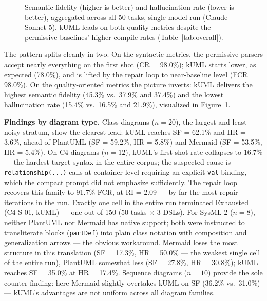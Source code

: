 \documentclass[acmsmall,nonacm]{acmart}
\begin{document}
\begin{figure}[h]
\centering
{}
\caption{Semantic fidelity (higher is better) and hallucination rate (lower is better), aggregated across all 50 tasks, single-model run (Claude Sonnet 5). kUML leads on both quality metrics despite the permissive baselines' higher compile rates (Table~\ref{tab:overall}).}
\label{fig:sf-hr-bars}
\end{figure}

The pattern splits cleanly in two. On the syntactic metrics, the permissive parsers accept nearly everything on the first shot (CR = 98.0\%); kUML starts lower, as expected (78.0\%), and is lifted by the repair loop to near-baseline level (FCR = 98.0\%). On the quality-oriented metrics the picture inverts: kUML delivers the highest semantic fidelity (45.3\% vs.\ 37.9\% and 37.4\%) and the lowest hallucination rate (15.4\% vs.\ 16.5\% and 21.9\%), visualized in Figure~\ref{fig:sf-hr-bars}.

\textbf{Findings by diagram type.} Class diagrams ($n = 20$), the largest and least noisy stratum, show the clearest lead: kUML reaches SF = 62.1\% and HR = 3.6\%, ahead of PlantUML (SF = 59.2\%, HR = 5.8\%) and Mermaid (SF = 53.5\%, HR = 5.4\%). On C4 diagrams ($n = 12$), kUML's first-shot rate collapses to 16.7\% --- the hardest target syntax in the entire corpus; the suspected cause is \texttt{relationship(...)} calls at container level requiring an explicit \texttt{val} binding, which the compact prompt did not emphasize sufficiently. The repair loop recovers this family to 91.7\% FCR, at RI = 2.09 --- by far the most repair iterations in the run. Exactly one cell in the entire run terminated Exhausted (C4-S-01, kUML) --- one out of 150 (50 tasks $\times$ 3 DSLs). For SysML 2 ($n = 8$), neither PlantUML nor Mermaid has native support; both were instructed to transliterate blocks (\texttt{partDef}) into plain class notation with composition and generalization arrows --- the obvious workaround. Mermaid loses the most structure in this translation (SF = 17.3\%, HR = 50.0\% --- the weakest single cell of the entire run), PlantUML somewhat less (SF = 27.8\%, HR = 30.8\%); kUML reaches SF = 35.0\% at HR = 17.4\%. Sequence diagrams ($n = 10$) provide the sole counter-finding: here Mermaid slightly overtakes kUML on SF (36.2\% vs.\ 31.0\%) --- kUML's advantages are not uniform across all diagram families.
\end{document}

